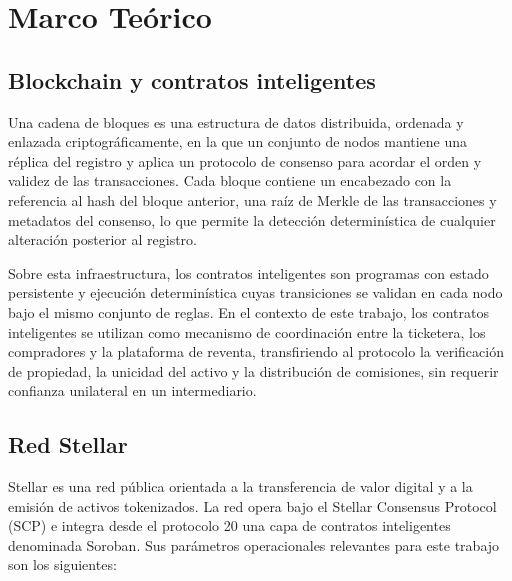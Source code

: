 \newpage
\section{Marco Teórico}

\subsection{Blockchain y contratos inteligentes}

Una cadena de bloques es una estructura de datos distribuida, ordenada y enlazada criptográficamente, en la que un conjunto de nodos mantiene una réplica del registro y aplica un protocolo de consenso para acordar el orden y validez de las transacciones. Cada bloque contiene un encabezado con la referencia al hash del bloque anterior, una raíz de Merkle de las transacciones y metadatos del consenso, lo que permite la detección determinística de cualquier alteración posterior al registro.

Sobre esta infraestructura, los contratos inteligentes son programas con estado persistente y ejecución determinística cuyas transiciones se validan en cada nodo bajo el mismo conjunto de reglas. En el contexto de este trabajo, los contratos inteligentes se utilizan como mecanismo de coordinación entre la ticketera, los compradores y la plataforma de reventa, transfiriendo al protocolo la verificación de propiedad, la unicidad del activo y la distribución de comisiones, sin requerir confianza unilateral en un intermediario.

\subsection{Red Stellar}

Stellar es una red pública orientada a la transferencia de valor digital y a la emisión de activos tokenizados. La red opera bajo el Stellar Consensus Protocol (SCP) e integra desde el protocolo 20 una capa de contratos inteligentes denominada Soroban. Sus parámetros operacionales relevantes para este trabajo son los siguientes:

